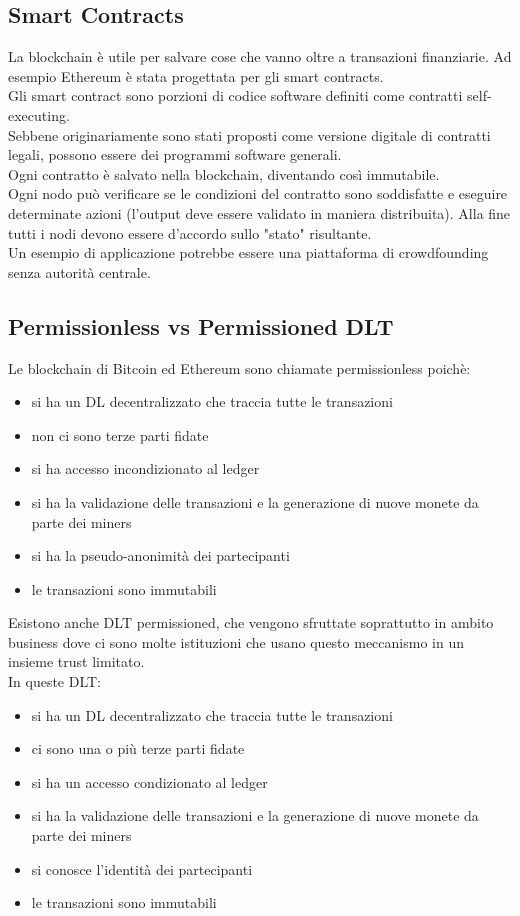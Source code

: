 \subsection{Smart Contracts}
La blockchain è utile per salvare cose che vanno oltre a transazioni finanziarie. Ad esempio Ethereum è stata progettata per gli smart contracts.\\
Gli smart contract sono porzioni di codice software definiti come contratti self-executing.\\Sebbene originariamente sono stati proposti come versione digitale di contratti legali, possono essere dei programmi software generali.\\
Ogni contratto è salvato nella blockchain, diventando così immutabile.\\
Ogni nodo può verificare se le condizioni del contratto sono soddisfatte e eseguire determinate azioni (l'output deve essere validato in maniera distribuita). Alla fine tutti i nodi devono essere d'accordo sullo "stato" risultante.\\
Un esempio di applicazione potrebbe essere una piattaforma di crowdfounding senza autorità centrale.

\subsection{Permissionless vs Permissioned DLT}
Le blockchain di Bitcoin ed Ethereum sono chiamate permissionless poichè:
\begin{itemize}
    \item si ha un DL decentralizzato che traccia tutte le transazioni
    \item non ci sono terze parti fidate
    \item si ha accesso incondizionato al ledger
    \item si ha la validazione delle transazioni e la generazione di nuove monete da parte dei miners
    \item si ha la pseudo-anonimità dei partecipanti
    \item le transazioni sono immutabili
\end{itemize}
Esistono anche DLT permissioned, che vengono sfruttate soprattutto in ambito business dove ci sono molte istituzioni che usano questo meccanismo in un insieme trust limitato.\\
In queste DLT:
\begin{itemize}
    \item si ha un DL decentralizzato che traccia tutte le transazioni
    \item ci sono una o più terze parti fidate
    \item si ha un accesso condizionato al ledger
    \item  si ha la validazione delle transazioni e la generazione di nuove monete da parte dei miners
    \item si conosce l'identità dei partecipanti
    \item le transazioni sono immutabili
\end{itemize}

